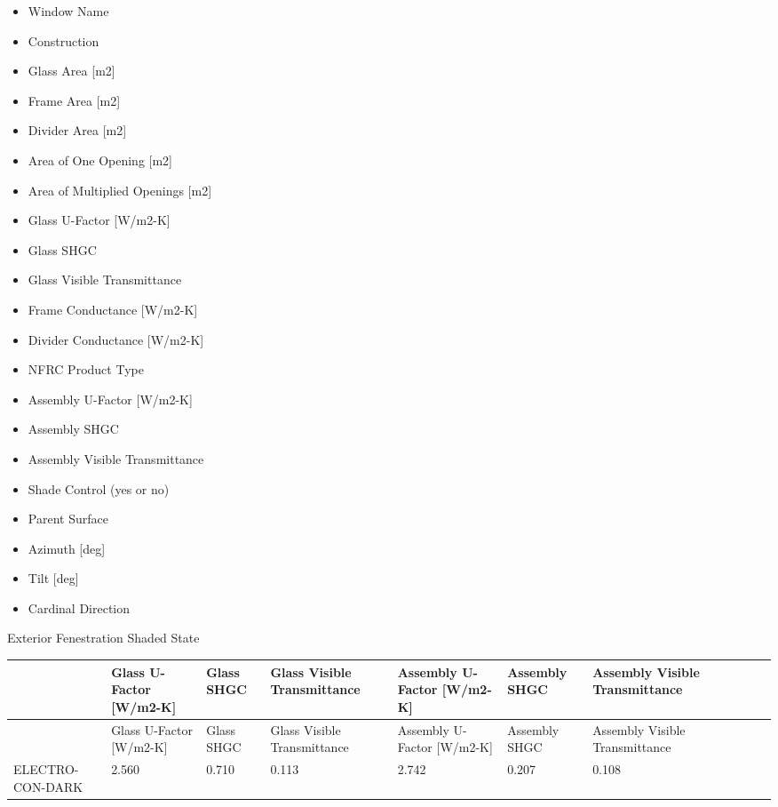\begin{itemize}
\item
  Window Name
\item
  Construction
\item
  Glass Area [m2]
\item
  Frame Area [m2]
\item
  Divider Area [m2]
\item
  Area of One Opening [m2]
\item
  Area of Multiplied Openings [m2]
\item
  Glass U-Factor [W/m2-K]
\item
  Glass SHGC
\item
  Glass Visible Transmittance
\item
  Frame Conductance [W/m2-K]
\item
  Divider Conductance [W/m2-K]
\item
  NFRC Product Type
\item
  Assembly U-Factor [W/m2-K]
\item
  Assembly SHGC
\item
  Assembly Visible Transmittance
\item
  Shade Control (yes or no)
\item
  Parent Surface
\item
  Azimuth [deg]
\item
  Tilt [deg]
\item
  Cardinal Direction
\end{itemize}



Exterior Fenestration Shaded State


{\scriptsize
\begin{longtable}[c]{>{\raggedright}p{0.5in}>{\raggedright}p{0.5in}>{\raggedright}p{0.5in}>{\raggedright}p{0.5in}>{\raggedright}p{0.5in}>{\raggedright}p{0.5in}>{\raggedright}p{0.5in}>{\raggedright}p{0.5in}>{\raggedright}p{0.5in}>{\raggedright}p{0.5in}>{\raggedright}p{0.5in}}
\toprule 
~ & Glass U-Factor [W/m2-K] & Glass SHGC & Glass Visible Transmittance & Assembly U-Factor [W/m2-K] & Assembly SHGC & Assembly Visible Transmittance \tabularnewline
\midrule
\endfirsthead

\toprule 
~ & Glass U-Factor [W/m2-K] & Glass SHGC & Glass Visible Transmittance & Assembly U-Factor [W/m2-K] & Assembly SHGC & Assembly Visible Transmittance \tabularnewline
\midrule
\endhead

ELECTRO-CON-DARK & 2.560 & 0.710 & 0.113 & 2.742 & 0.207 & 0.108 \tabularnewline

\bottomrule
\end{longtable}}


